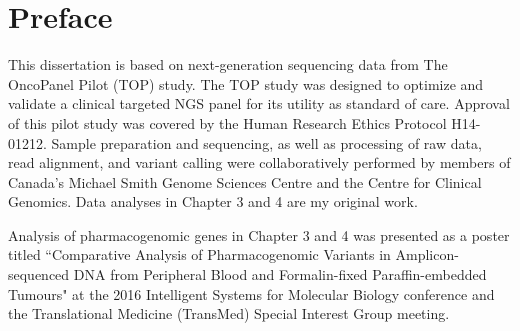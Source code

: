 
\chapter{Preface}

This dissertation is based on next-generation sequencing data from The OncoPanel Pilot (TOP) study. The TOP study was designed to optimize and validate a clinical targeted NGS panel for its utility as standard of care. Approval of this pilot study was covered by the Human Research Ethics Protocol H14-01212. Sample preparation and sequencing, as well as processing of raw data, read alignment, and variant calling were collaboratively performed by members of Canada's Michael Smith Genome Sciences Centre and the Centre for Clinical Genomics. Data analyses in Chapter 3 and 4 are my original work.

Analysis of pharmacogenomic genes in Chapter 3 and 4 was presented as a poster titled ``Comparative Analysis of Pharmacogenomic Variants in Amplicon-sequenced DNA from Peripheral Blood and Formalin-fixed Paraffin-embedded Tumours" at the 2016 Intelligent Systems for Molecular Biology conference and the Translational Medicine (TransMed) Special Interest Group meeting.
